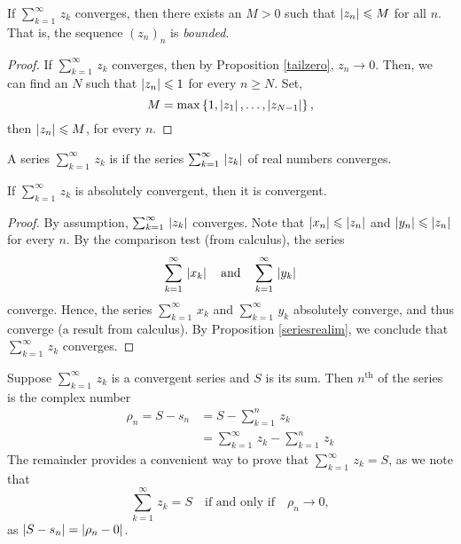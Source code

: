 \vspace*{1em}

\begin{corollary}\label{tailbound}
If $\sum_{k=1}^\infty \,z_k$ converges, then there exists an $M > 0$ such that $\left\lvert z_n\right\rvert \leqslant M$ for all $n$. That is, the sequence $(z_n)_n$ is \emph{bounded}.
\end{corollary}
\begin{proof}
If $\sum_{k=1}^\infty \,z_k$ converges, then by Proposition \ref{tailzero}, $z_n \to 0$. Then, we can find an $N$ such that $\left\lvert z_n\right\rvert \leqslant 1$ for every $n \geq N$. Set, 
\[M = \max\left\{1,\left\lvert z_1\right\rvert,\ldots,\left\lvert z_{N-1}\right\rvert\right\},\]
then $\left\lvert z_n\right\rvert \leqslant M$, for every $n$. 
\end{proof}

\vspace*{1em}

\begin{definition}
A series $\sum_{k=1}^\infty \,z_k$ is  if the series $\sum_{k=1}^\infty \,\left\lvert z_k\right\rvert$ of real numbers converges.
\end{definition}

\vspace*{1em}

\begin{corollary}
If $\sum_{k=1}^\infty \,z_k$ is absolutely convergent, then it is convergent.
\end{corollary}
\begin{proof}
By assumption, $\sum_{k=1}^\infty \,\left\lvert z_k\right\rvert$ converges. Note that $\left\lvert x_n\right\rvert \leqslant \left\lvert z_n\right\rvert$ and $\left\lvert y_n\right\rvert \leqslant \left\lvert z_n\right\rvert$ for every $n$. By the comparison test (from calculus), the series
\[\sum_{k=1}^\infty \,\left\lvert x_k\right\rvert \quad \text{and} \quad \sum_{k=1}^\infty \,\left\lvert y_k\right\rvert\]
converge. Hence, the series $\sum_{k=1}^\infty \,x_k$ and $\sum_{k=1}^\infty \,y_k$ absolutely converge, and thus converge (a result from calculus). By Proposition \ref{seriesrealim}, we conclude that $\sum_{k=1}^\infty \,z_k$ converges.
\end{proof}

\vspace*{1em}

\begin{definition}
Suppose $\sum_{k=1}^\infty \,z_k$ is a convergent series and $S$ is its sum. Then {\color{blue}$n^{\text{th}}$}  of the series is the complex number
\begin{align*}
\rho_n = S - s_n &= S - \sum_{k=1}^n\,z_k\\[0.5em]
&= \sum_{k=1}^\infty\,z_k - \sum_{k=1}^n\,z_k
\end{align*}
The remainder provides a convenient way to prove that $\sum_{k=1}^\infty\,z_k = S$, as we note that
\[\sum_{k=1}^\infty\,z_k = S \quad \text{if and only if} \quad \rho_n \to 0,\]
as $\left\lvert S - s_n\right\rvert = \left\lvert\rho_n - 0\right\rvert$.
\end{definition}

